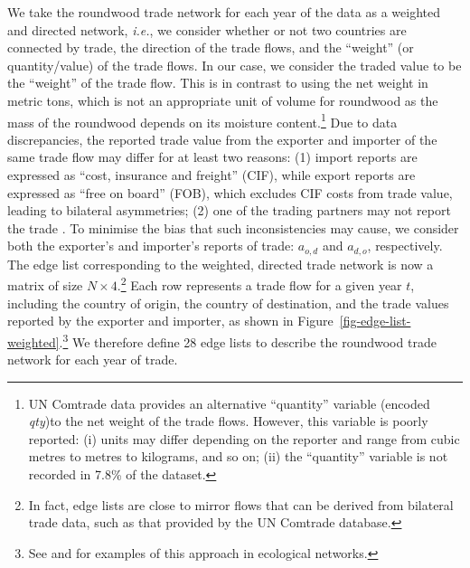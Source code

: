 \documentclass[
  authoryear,
  review,
  3p]{elsarticle}
\begin{document}
We take the roundwood trade network for each year of the data as a
weighted and directed network, \emph{i.e.}, we consider whether or not
two countries are connected by trade, the direction of the trade flows,
and the ``weight'' (or quantity/value) of the trade flows. In our case,
we consider the traded value to be the ``weight'' of the trade flow.
This is in contrast to using the net weight in metric tons, which is not
an appropriate unit of volume for roundwood as the mass of the roundwood
depends on its moisture content.\footnote{UN Comtrade data provides an
  alternative ``quantity'' variable (encoded \emph{qty})to the net
  weight of the trade flows. However, this variable is poorly reported:
  (i) units may differ depending on the reporter and range from cubic
  metres to metres to kilograms, and so on; (ii) the ``quantity''
  variable is not recorded in 7.8\% of the dataset.} Due to data
discrepancies, the reported trade value from the exporter and importer
of the same trade flow may differ for at least two reasons: (1) import
reports are expressed as ``cost, insurance and freight'' (CIF), while
export reports are expressed as ``free on board'' (FOB), which excludes
CIF costs from trade value, leading to bilateral asymmetries; (2) one of
the trading partners may not report the trade
\citep{gaulier_baci_2010, rougieux_forest_2017, kallio_reliability_2018, chen_advancing_2022, mitikj_bridging_2024}.
To minimise the bias that such inconsistencies may cause, we consider
both the exporter's and importer's reports of trade: \(a_{o,d}\) and
\(a_{d,o}\), respectively. The edge list corresponding to the weighted,
directed trade network is now a matrix of size
\(N \times 4\).\footnote{In fact, edge lists are close to mirror flows
  that can be derived from bilateral trade data, such as that provided
  by the UN Comtrade database.} Each row represents a trade flow for a
given year \(t\), including the country of origin, the country of
destination, and the trade values reported by the exporter and importer,
as shown in Figure~\ref{fig-edge-list-weighted}.\footnote{See
  \citet{rayfield_connectivity_2011} and \citet{thompson_loss_2017} for
  examples of this approach in ecological networks.} We therefore define
28 edge lists to describe the roundwood trade network for each year of
trade.
\end{document}
